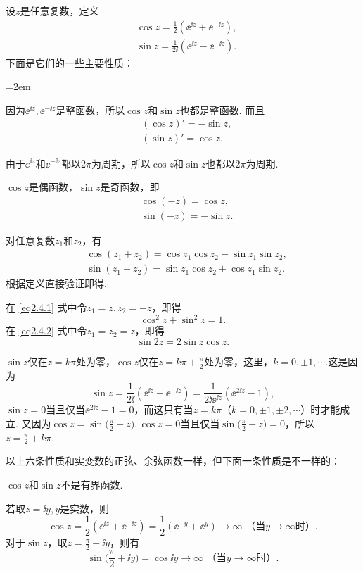 设$z$是任意复数，定义
\begin{align*}
  &\cos z=\frac12(\ee^{\ii z}+\ee^{-\ii z}),\\
  &\sin z=\frac1{2\ii}(\ee^{\ii z}-\ee^{-\ii z}).
\end{align*}
下面是它们的一些主要性质：
\begin{eenum}\parindent=2em
  \item 因为$\ee^{\ii z},\ee^{-\ii z}$是整函数，所以$\cos z$和$\sin z$也都是整函数.
而且
\begin{align*}
  &(\cos z)'=-\sin z,\\
  &(\sin z)'=\cos z.
\end{align*}
\item 由于$\ee^{\ii z}$和$\ee^{-\ii z}$都以$2\pi$为周期，所以$\cos z$和$\sin z$也都以$2\pi$为周期.
\item $\cos z$是偶函数，$\sin z$是奇函数，即
\begin{align*}
  &\cos(-z)=\cos z,\\
  &\sin(-z)=-\sin z.
\end{align*}
\item 对任意复数$z_1$和$z_2$，有
\begin{align}
  &\cos(z_1+z_2)=\cos z_1\cos z_2-\sin z_1\sin z_2,\label{eq2.4.1}\\
  &\sin(z_1+z_2)=\sin z_1\cos z_2+\cos z_1\sin z_2.\label{eq2.4.2}
\end{align}
根据定义直接验证即得.
\item 在 \eqref{eq2.4.1} 式中令$z_1=z,z_2=-z$，即得
\[\cos^2 z+\sin ^2z=1.\]
在 \eqref{eq2.4.2} 式中令$z_1=z_2=z$，即得
\[\sin2z=2\sin z\cos z.\]
\item $\sin z$仅在$z=k\pi$处为零，$\cos z$仅在$z=k\pi+\frac\pi2$处为零，这里，$k=0,\pm1,\cdots$.这是因为
    \[\sin z=\frac1{2\ii}(\ee^{\ii z}-\ee^{-\ii z})=\frac1{2\ii\ee^{\ii z}}(\ee^{2\ii z}-1),\]
$\sin z=0$当且仅当$\ee^{2\ii z}-1=0$，而这只有当$z=k\pi$（$k=0,\pm1,\pm2,\cdots$）时才能成立. 又因为$\cos z=\sin\bigg(\frac\pi2-z\bigg),\cos z=0$当且仅当$\sin\bigg(\frac\pi2-z\bigg)=0$，所以$z=\frac\pi2+k\pi$.

以上六条性质和实变数的正弦、余弦函数一样，但下面一条性质是不一样的：
\item $\cos z$和$\sin z$不是有界函数.

若取$z=\ii y,y$是实数，则
\[\cos z=\frac12(\ee^{\ii z}+\ee^{-\ii z})=\frac12(\ee^{-y}+\ee^y)\to\infty \mbox{ （当$y\to\infty$时）}.\]
对于$\sin z$，取$z=\frac\pi2+\ii y$，则有
\[\sin\bigg(\frac\pi2+\ii y\bigg)=\cos \ii y\to\infty\mbox{ （当$y\to\infty$时）}.\]
\end{eenum}

